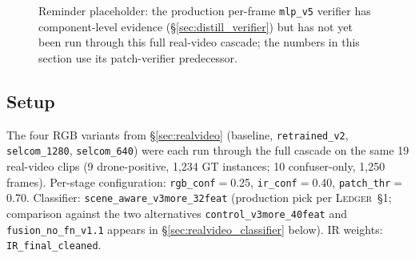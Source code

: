 \documentclass[12pt,a4paper,oneside,openright]{book}
\begin{document}
\begin{figure}[htbp]
    \centering
    \caption{Reminder placeholder: the production per-frame \texttt{mlp\_v5} verifier has component-level evidence (\S\ref{sec:distill_verifier}) but has not yet been run through this full real-video cascade; the numbers in this section use its patch-verifier predecessor.}
    \label{fig:mlp_pipeline_placeholder}
\end{figure}

\subsection{Setup}
The four RGB variants from \S\ref{sec:realvideo} (baseline, \texttt{retrained\_v2}, \texttt{selcom\_1280}, \texttt{selcom\_640}) were each run through the full cascade on the same 19 real-video clips (9 drone-positive, 1{,}234 GT instances; 10 confuser-only, 1{,}250 frames). Per-stage configuration: \texttt{rgb\_conf}$=$0.25, \texttt{ir\_conf}$=$0.40, \texttt{patch\_thr}$=$0.70. Classifier: \texttt{scene\_aware\_v3more\_32feat} (production pick per \textsc{Ledger}~\S1; comparison against the two alternatives \texttt{control\_v3more\_40feat} and \texttt{fusion\_no\_fn\_v1.1} appears in \S\ref{sec:realvideo_classifier} below). IR weights: \texttt{IR\_final\_cleaned}.
\end{document}

